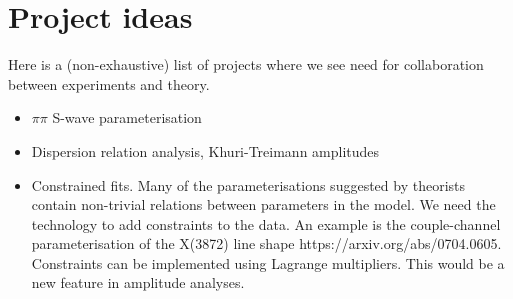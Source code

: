 \section{Project ideas}
Here is a (non-exhaustive) list of projects where we see need for collaboration between experiments and theory.
\begin{itemize}
\item $\pi\pi$ S-wave parameterisation
\item Dispersion relation analysis, Khuri-Treimann amplitudes
\item Constrained fits. Many of the parameterisations suggested by theorists contain non-trivial relations between parameters in the model. We need the technology to add constraints to the data. An example is the couple-channel parameterisation of the X(3872) line shape https://arxiv.org/abs/0704.0605\cite{Hanhart_2007}. Constraints can be implemented using Lagrange multipliers. This would be a new feature in amplitude analyses.
\end{itemize}